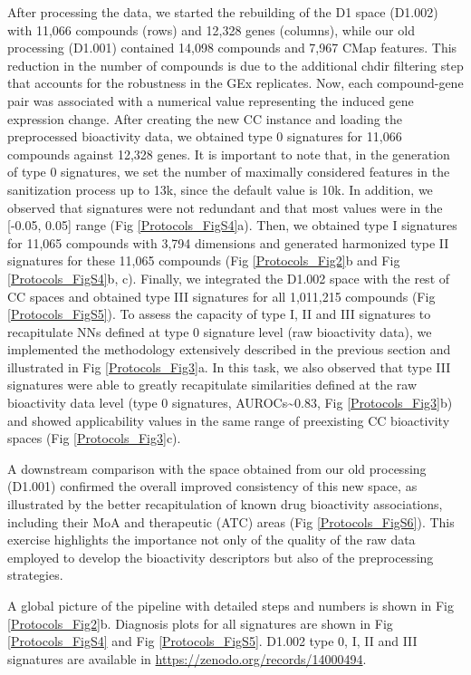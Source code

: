 After processing the data, we started the rebuilding of the D1 space (D1.002) with 11,066 compounds (rows) and 12,328 genes (columns), while our old processing (D1.001) contained 14,098 compounds and 7,967 CMap features. This reduction in the number of compounds is due to the additional chdir filtering step that accounts for the robustness in the GEx replicates. Now, each compound-gene pair was associated with a numerical value representing the induced gene expression change. After creating the new CC instance and loading the preprocessed bioactivity data, we obtained type 0 signatures for 11,066 compounds against 12,328 genes. It is important to note that, in the generation of type 0 signatures, we set the number of maximally considered features in the sanitization process up to 13k, since the default value is 10k. In addition, we observed that signatures were not redundant and that most values were in the [-0.05, 0.05] range (Fig \ref{Protocols_FigS4}a). Then, we obtained type I signatures for 11,065 compounds with 3,794 dimensions and generated harmonized type II signatures for these 11,065 compounds (Fig \ref{Protocols_Fig2}b and Fig \ref{Protocols_FigS4}b, c). Finally, we integrated the D1.002 space with the rest of CC spaces and obtained type III signatures for all 1,011,215 compounds (Fig \ref{Protocols_FigS5}). To assess the capacity of type I, II and III signatures to recapitulate NNs defined at type 0 signature level (raw bioactivity data), we implemented the methodology extensively described in the previous section and illustrated in Fig \ref{Protocols_Fig3}a. In this task, we also observed that type III signatures were able to greatly recapitulate similarities defined at the raw bioactivity data level (type 0 signatures, AUROCs\textasciitilde0.83, Fig \ref{Protocols_Fig3}b) and showed applicability values in the same range of preexisting CC bioactivity spaces (Fig \ref{Protocols_Fig3}c).

A downstream comparison with the space obtained from our old processing (D1.001) confirmed the overall improved consistency of this new space, as illustrated by the better recapitulation of known drug bioactivity associations, including their MoA and therapeutic (ATC) areas (Fig \ref{Protocols_FigS6}). This exercise highlights the importance not only of the quality of the raw data employed to develop the bioactivity descriptors but also of the preprocessing strategies.

A global picture of the pipeline with detailed steps and numbers is shown in Fig \ref{Protocols_Fig2}b. Diagnosis plots for all signatures are shown in Fig \ref{Protocols_FigS4} and Fig \ref{Protocols_FigS5}. D1.002 type 0, I, II and III signatures are available in \href{https://zenodo.org/records/14000494}{https://zenodo.org/records/14000494}. 


